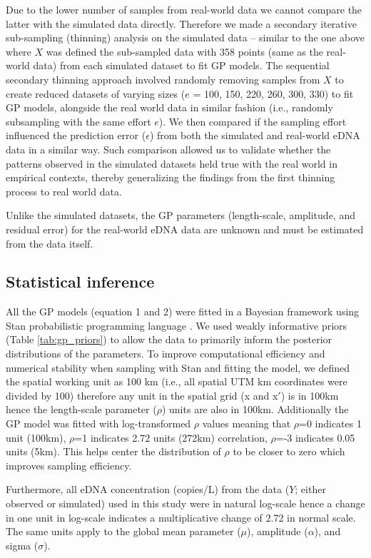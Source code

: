\documentclass{article}
\begin{document}
Due to the lower number of samples from real-world data we cannot compare the latter with the simulated data directly. Therefore we made a secondary iterative sub-sampling (thinning) analysis on the simulated data -- similar to the one above where $X$ was defined the sub-sampled data with 358 points (same as the real-world data) from each simulated dataset to fit GP models. The sequential secondary thinning approach involved randomly removing samples from $X$ to create reduced datasets of varying sizes ($e$ = 100, 150, 220, 260, 300, 330) to fit GP models, alongside the real world data in similar fashion (i.e., randomly subsampling with the same effort $e$). We then compared if the sampling effort influenced the prediction error ($\epsilon$) from both the simulated and real-world eDNA data in a similar way. Such comparison allowed us to validate whether the patterns observed in the simulated datasets held true with the real world in empirical contexts, thereby generalizing the findings from the first thinning process to real world data.

Unlike the simulated datasets, the GP parameters (length-scale, amplitude, and residual error) for the real-world eDNA data are unknown and must be estimated from the data itself.


\subsection{Statistical inference} 

All the GP models (equation 1 and 2) were fitted in a Bayesian framework using Stan probabilistic programming language \citep{carpenter2017}. We used weakly informative priors (Table \ref{tab:gp_priors}) to allow the data to primarily inform the posterior distributions of the parameters. To improve computational efficiency and numerical stability when sampling with Stan and fitting the model, we defined the spatial working unit as 100 km (i.e., all spatial UTM km coordinates were divided by 100) therefore any unit in the spatial grid (x and x$\prime$) is in 100km hence the length-scale parameter ($\rho$) units are also in 100km. Additionally the GP model was fitted with log-transformed $\rho$ values meaning that $\rho$=0 indicates 1 unit (100km), $\rho$=1 indicates 2.72 units (272km) correlation, $\rho$=-3 indicates 0.05 units (5km). This helps center the distribution of $\rho$ to be closer to zero which improves sampling efficiency.

Furthermore, all eDNA concentration (copies/L) from the data ($Y$; either observed or simulated) used in this study were in natural log-scale hence a change in one unit in log-scale indicates a multiplicative change of 2.72 in normal scale. The same units apply to the global mean parameter ($\mu$), amplitude ($\alpha$), and sigma ($\sigma$). 
\end{document}
